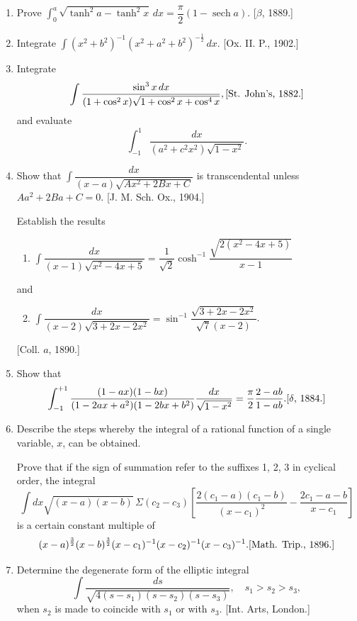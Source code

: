 \documentclass[11pt, a4paper]{article}
\newcommand{\source}[1]{\hfill\textnormal{[#1]}}
\begin{document}
\begin{enumerate}[leftmargin=2em]
Integrate completely the function
\[
\dfrac{x+3}{(2x^2-10x+17)\sqrt{4x^2-26x+49}}. \source{Math. Trip., 1891.}
\]

\item Prove $\displaystyle\int_0^a \sqrt{\tanh^2a-\tanh^2x}\,dx=\dfrac{\pi}{2}(1-\operatorname{sech}a)$. \source{$\beta$, 1889.}

\item Integrate $\displaystyle\int (x^2+b^2)^{-1}(x^2+a^2+b^2)^{-\frac12}\,dx$. \source{Ox. II. P., 1902.}

\item Integrate
\[
\int \dfrac{\sin^3x\,dx}{(1+\cos^2x)\sqrt{1+\cos^2x+\cos^4x}}, \source{St. John's, 1882.}
\]
and evaluate
\[
\int_{-1}^{1} \dfrac{dx}{(a^2+c^2x^2)\sqrt{1-x^2}}.
\]

\item Show that $\displaystyle\int \dfrac{dx}{(x-a)\sqrt{Ax^2+2Bx+C}}$ is transcendental unless $Aa^2+2Ba+C=0$. \source{J. M. Sch. Ox., 1904.}

Establish the results
\begin{enumerate}[label=(\roman*)]
\item $\displaystyle\int \dfrac{dx}{(x-1)\sqrt{x^2-4x+5}}=\dfrac{1}{\sqrt2}\cosh^{-1}\dfrac{\sqrt{2(x^2-4x+5)}}{x-1}$
\end{enumerate}
and
\begin{enumerate}[label=(\roman*)]
\setcounter{enumii}{1}
\item $\displaystyle\int \dfrac{dx}{(x-2)\sqrt{3+2x-2x^2}}=\sin^{-1}\dfrac{\sqrt{3+2x-2x^2}}{\sqrt7(x-2)}$.
\end{enumerate}
\source{Coll. $a$, 1890.}

\item Show that
\[
\int_{-1}^{+1} \dfrac{(1-ax)(1-bx)}{(1-2ax+a^2)(1-2bx+b^2)}\dfrac{dx}{\sqrt{1-x^2}}=\dfrac{\pi}{2}\dfrac{2-ab}{1-ab}. \source{$\delta$, 1884.}
\]

\item Describe the steps whereby the integral of a rational function of a single variable, $x$, can be obtained.

Prove that if the sign of summation refer to the suffixes 1, 2, 3 in cyclical order, the integral
\[
\int dx\sqrt{(x-a)(x-b)}\,\Sigma(c_2-c_3)\left[\dfrac{2(c_1-a)(c_1-b)}{(x-c_1)^2}-\dfrac{2c_1-a-b}{x-c_1}\right]
\]
is a certain constant multiple of
\[
(x-a)^{\frac32}(x-b)^{\frac32}(x-c_1)^{-1}(x-c_2)^{-1}(x-c_3)^{-1}. \source{Math. Trip., 1896.}
\]

\item Determine the degenerate form of the elliptic integral
\[
\int \dfrac{ds}{\sqrt{4(s-s_1)(s-s_2)(s-s_3)}}, \quad s_1>s_2>s_3,
\]
when $s_2$ is made to coincide with $s_1$ or with $s_3$. \source{Int. Arts, London.}


\end{enumerate}
\end{document}
